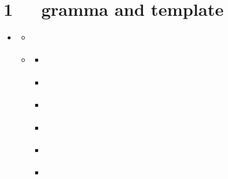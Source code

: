 \documentclass[letterpaper,12pt,english]{sphinxmanual}
\begin{document}
\chapter{1   gramma and template}
\label{\detokenize{001software/001install/linux:gramma-and-template}}\label{\detokenize{001software/001install/linux::doc}}
\begin{sphinxShadowBox}
\begin{itemize}
\item {} 
\label{\detokenize{001software/001install/linux:id30}}{\hyperref[\detokenize{001software/001install/linux:gramma-and-template}]{}}
\begin{itemize}
\item {} 
\label{\detokenize{001software/001install/linux:id31}}{\hyperref[\detokenize{001software/001install/linux:id1}]{}}

\item {} 
\label{\detokenize{001software/001install/linux:id32}}{\hyperref[\detokenize{001software/001install/linux:linux-help}]{}}
\begin{itemize}
\item {} 
\label{\detokenize{001software/001install/linux:id33}}{\hyperref[\detokenize{001software/001install/linux:rm}]{}}

\item {} 
\label{\detokenize{001software/001install/linux:id34}}{\hyperref[\detokenize{001software/001install/linux:cp}]{}}

\item {} 
\label{\detokenize{001software/001install/linux:id35}}{\hyperref[\detokenize{001software/001install/linux:touch}]{}}

\item {} 
\label{\detokenize{001software/001install/linux:id36}}{\hyperref[\detokenize{001software/001install/linux:ls}]{}}

\item {} 
\label{\detokenize{001software/001install/linux:id37}}{\hyperref[\detokenize{001software/001install/linux:find}]{}}

\item {} 
\label{\detokenize{001software/001install/linux:id38}}{\hyperref[\detokenize{001software/001install/linux:sed}]{}}


\end{itemize}
\end{itemize}
\end{itemize}
\end{sphinxShadowBox}
\end{document}
